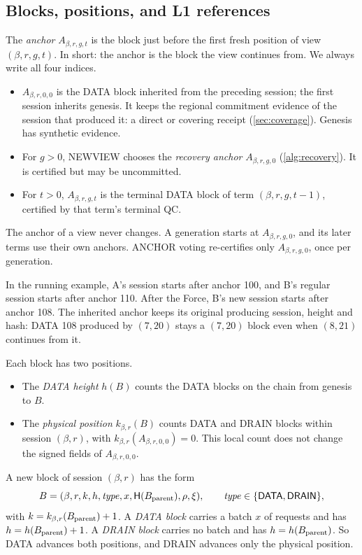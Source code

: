 \documentclass[11pt,a4paper]{article}
\newcommand{\Hash}{\mathsf H}
\newcommand{\tagg}[1]{\ensuremath{\mathsf{#1}}}
\newcommand{\defterm}[1]{\textcolor{rrBlue}{\textit{#1}}}
\begin{document}
\subsection{Blocks, positions, and L1 references}
\label{sec:blocks}
The \defterm{anchor} $A_{\beta,r,g,t}$ is the block just before the first
fresh position of view $(\beta,r,g,t)$. In short: the anchor is the block
the view continues from. We always write all four indices.
\begin{itemize}
\item $A_{\beta,r,0,0}$ is the DATA block inherited from the preceding
session; the first session inherits genesis. It keeps the regional
commitment evidence of the session that produced it: a direct or
covering receipt (\cref{sec:coverage}). Genesis has synthetic evidence.
\item For $g>0$, NEWVIEW chooses the \defterm{recovery anchor}
$A_{\beta,r,g,0}$ (\cref{alg:recovery}). It is certified but may be
uncommitted.
\item For $t>0$, $A_{\beta,r,g,t}$ is the terminal DATA block of term
$(\beta,r,g,t-1)$, certified by that term's terminal QC.
\end{itemize}
The anchor of a view never changes. A generation starts at
$A_{\beta,r,g,0}$, and its later terms use their own anchors. ANCHOR
voting re-certifies only $A_{\beta,r,g,0}$, once per generation.

In the running example, A's session starts after anchor 100, and B's
regular session starts after anchor 110. After the Force, B's new session
starts after anchor 108. The inherited anchor keeps its original
producing session, height and hash: DATA 108 produced by $(7,20)$ stays
a $(7,20)$ block even when $(8,21)$ continues from it.

Each block has two positions.
\begin{itemize}
\item The \defterm{DATA height} $h(B)$ counts the DATA blocks on the chain
from genesis to $B$.
\item The \defterm{physical position} $k_{\beta,r}(B)$ counts DATA and DRAIN
blocks within session $(\beta,r)$, with $k_{\beta,r}(A_{\beta,r,0,0})=0$.
This local count does not change the signed fields of $A_{\beta,r,0,0}$.
\end{itemize}
A new block of session $(\beta,r)$ has the form
\[
 B=(\beta,r,k,h,\mathit{type},x,\Hash(B_{\rm parent}),\rho,\xi),
 \qquad \mathit{type}\in\{\tagg{DATA},\tagg{DRAIN}\},
\]
with $k=k_{\beta,r}(B_{\rm parent})+1$. A \defterm{DATA block} carries a
batch $x$ of requests and has $h=h(B_{\rm parent})+1$. A \defterm{DRAIN
block} carries no batch and has $h=h(B_{\rm parent})$. So DATA advances
both positions, and DRAIN advances only the physical position.
\end{document}
